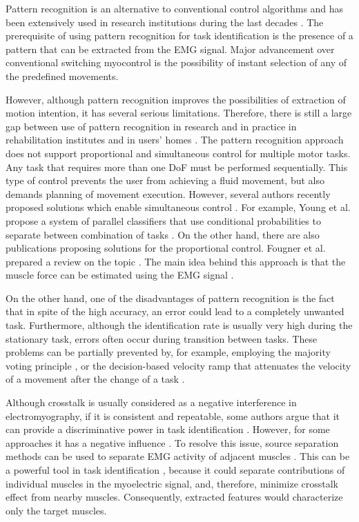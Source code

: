 Pattern recognition is an alternative to conventional control algorithms and has been extensively used in research institutions during the last decades \citep{Hakonen2015, Farina2014, Nazmi2016}. The prerequisite of using pattern recognition for task identification is the presence of a pattern that can be extracted from the EMG signal. Major advancement over conventional switching myocontrol is the possibility of instant selection of any of the predefined movements.

However, although pattern recognition improves the possibilities of extraction of motion intention, it has several serious limitations. Therefore, there is still a large gap between use of pattern recognition in research and in practice in rehabilitation institutes and in users' homes \citep{Jiang2012}. The pattern recognition approach does not support proportional and simultaneous control for multiple motor tasks. Any task that requires more than one DoF must be performed sequentially. This type of control prevents the user from achieving a fluid movement, but also demands planning of movement execution. However, several authors recently proposed solutions which enable simultaneous control \citep{Young2013, Kamavuako2013, Baker2010}. For example, Young et al. propose a system of parallel classifiers that use conditional probabilities to separate between combination of tasks \citep{Young2013}. On the other hand, there are also publications proposing solutions for the proportional control. Fougner et al. prepared a review on the topic \citep{Fougner2012}. The main idea behind this approach is that the muscle force can be estimated using the EMG signal \citep{Staudenmann2010}. 

On the other hand, one of the disadvantages of pattern recognition is the fact that in spite of the high accuracy, an error could lead to a completely unwanted task. Furthermore, although the identification rate is usually very high during the stationary task, errors often occur during transition between tasks. These problems can be partially prevented by, for example, employing the majority voting principle \citep{Englehart2003}, or the decision-based velocity ramp that attenuates the velocity of a movement after the change of a task \citep{Simon2011}. %

Although crosstalk is usually considered as a negative interference in electromyography, if it is consistent and repeatable, some authors argue that it can provide a discriminative power in task identification \citep{Farina2014}. However, for some approaches it has a negative influence \citep{He2015}. To resolve this issue, source separation methods can be used to separate EMG activity of adjacent muscles \citep{Farina2004, Holobar2014}. This can be a powerful tool in task identification \citep{Naik2007}, because it could separate contributions of individual muscles in the myoelectric signal, and, therefore, minimize crosstalk effect from nearby muscles. Consequently, extracted features would characterize only the target muscles.


